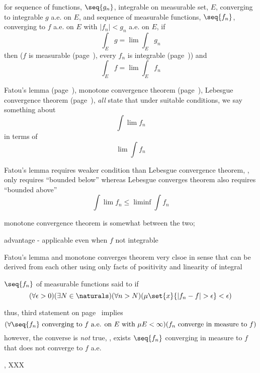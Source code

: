 \documentclass[17pt,landscape]{foils}
\begin{document}
{{\bit
	\item {}
		for sequence of functions, $\seq{g_n}$, integrable on measurable set, $E$,
		converging to integrable $g$ a.e. on $E$,
		and sequence of measurable functions, $\seq{f_n}$,
		converging to $f$ a.e. on $E$
		with $|f_n|<g_n$ a.e. on $E$,
		if
		\[
			\int_E g = \lim \int_E g_n
		\]
		then
		($f$ is measurable (page~\pageref{page:measurable:function:facts}),
		every $f_n$ is integrable (page~\pageref{integrable:nonnegative:function}))
		and
		\[
			\int_E f = \lim \int_E f_n
		\]
\eit


%

\bit
	\item Fatou's lemma (page~\pageref{page:integral:nonneg:facts}),
		monotone convergence theorem (page~\pageref{page:integral:nonneg:facts}),
		Lebesgue convergence theorem (page~\pageref{page:lebesgue-integral-facts-2}),
		\emph{all}
		state that under suitable conditions, we say something about
		\[
			\int \lim f_n
		\]
		in terms of
		\[
			\lim \int f_n
		\]

	\vitem Fatou's lemma requires weaker condition than Lebesgue convergence theorem, \ie,
		only requires ``bounded below'' whereas Lebesgue converges theorem also requires ``bounded above''
		\[
			\int \lim f_n \leq \liminf \int f_n
		\]

	\vitem monotone convergence theorem is somewhat between the two;
	\bit
		\item advantage - applicable even when $f$ not integrable
		\item Fatou's lemma and monotone converges theorem very clsoe in sense that
			can be derived from each other using only facts of positivity and linearity of integral
	\eit
\eit


%

\bit
	\item $\seq{f_n}$ of measurable functions said to  if
	\[
		(\forall \epsilon>0)
		(\exists N\in\naturals)
		(\forall n > N)
		(\mu\set{x}{|f_n-f|>\epsilon} < \epsilon)
	\]

	\vitem thus, third statement on page~\pageref{page:littlewood:three:principles} implies
	\[
			(\forall \seq{f_n} \mbox{ converging to } f \mbox { a.e. on } E \mbox{ with } \mu E<\infty)
			(f_n \mbox{ converge in measure to }f)
			\]
	\vitem however, the converse is \emph{not} {true}, \ie,
		exists $\seq{f_n}$ converging in measure to $f$ that does not converge to $f$ a.e.
	\bit
		\item \eg, XXX
	\eit

}}
\end{document}
